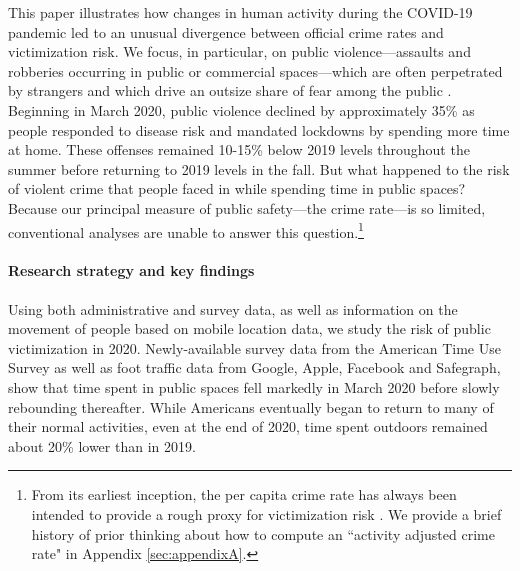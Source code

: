 \documentclass[12pt]{article}
\begin{document}
This paper illustrates how changes in human activity during the COVID-19 pandemic led to an unusual divergence between official crime rates and victimization risk. We focus, in particular, on public violence---assaults and robberies occurring in public or commercial spaces---which are often perpetrated by strangers and which drive an outsize share of fear among the public \citep{ferraro1995fear, pickett2012reconsidering, hanslmaier2013crime, ferraro2017measurement}. Beginning in March 2020, public violence declined by approximately 35\% as people responded to disease risk and mandated lockdowns by spending more time at home. These offenses remained 10-15\% below 2019 levels throughout the summer before returning to 2019 levels in the fall. But what happened to the risk of violent crime that people faced in while spending time in public spaces? Because our principal measure of public safety---the crime rate---is so limited, conventional analyses are unable to answer this question.\footnote{From its earliest inception, the per capita crime rate has always been intended to provide a rough proxy for victimization risk \citep{boggs1965urban, stipak1988alternatives, vaughan2020promise, ramos2021improving}. %
We provide a brief history of prior thinking about how to compute an ``activity adjusted crime rate" in Appendix \ref{sec:appendixA}.}


\paragraph{Research strategy and key findings}
Using both administrative and survey data, as well as information on the movement of people based on mobile location data, we study the risk of public victimization in 2020. Newly-available survey data from the American Time Use Survey as well as foot traffic data from Google, Apple, Facebook and Safegraph, show that time spent in public spaces fell markedly in March 2020 before slowly rebounding thereafter. While Americans eventually began to return to many of their normal activities, even at the end of 2020, time spent outdoors remained about 20\% lower than in 2019.
\end{document}
